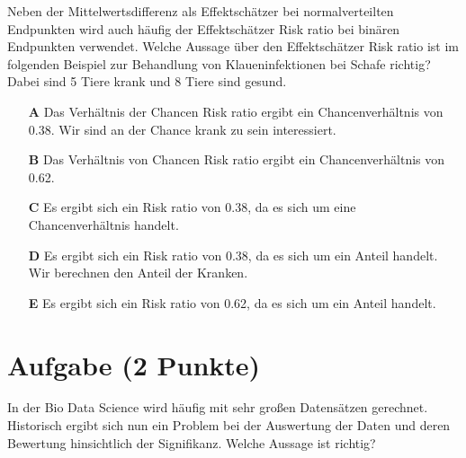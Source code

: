 \documentclass[a4paper, 9pt]{scrartcl}\usepackage[]{graphicx}\usepackage[]{xcolor}
\begin{document}
Neben der Mittelwertsdifferenz als Effektschätzer bei normalverteilten Endpunkten wird auch häufig der Effektschätzer Risk ratio bei binären Endpunkten verwendet. Welche Aussage über den Effektschätzer Risk ratio ist im folgenden Beispiel zur Behandlung von Klaueninfektionen bei Schafe richtig? Dabei sind 5 Tiere krank und 8 Tiere sind gesund.



\begin{enumerate}
\item [\textbf{A} \msquare] Das Verhältnis der Chancen Risk ratio ergibt ein Chancenverhältnis von 0.38. Wir sind an der Chance krank zu sein interessiert.
\item [\textbf{B} \msquare] Das Verhältnis von Chancen Risk ratio ergibt ein Chancenverhältnis von 0.62.
\item [\textbf{C} \msquare] Es ergibt sich ein Risk ratio von 0.38, da es sich um eine Chancenverhältnis handelt.
\item [\textbf{D} \msquare] Es ergibt sich ein Risk ratio von 0.38, da es sich um ein Anteil handelt. Wir berechnen den Anteil der Kranken.
\item [\textbf{E} \msquare] Es ergibt sich ein Risk ratio von 0.62, da es sich um ein Anteil handelt.
\end{enumerate}

\section{Aufgabe \hfill (2 Punkte)}



In der Bio Data Science wird häufig mit sehr großen Datensätzen gerechnet. Historisch ergibt sich nun ein Problem bei der Auswertung der Daten und deren Bewertung hinsichtlich der Signifikanz. Welche Aussage ist richtig?
\end{document}
